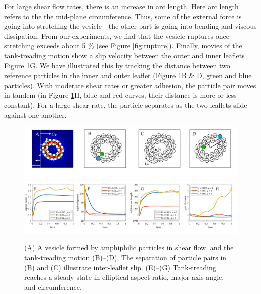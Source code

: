 For large shear flow rates, there is an increase in arc length. Here arc
length refers to the the mid-plane circumference. Thus, some of the
external force is going into stretching the vesicle---the other part is
going into bending and viscous dissipation. From our experiments, we
find that the vesicle ruptures once stretching exceeds about 5 \% (see
Figure \ref{fig:rupture}). Finally, movies of the tank-treading motion
show a slip velocity between the outer and inner leaflets Figure
\ref{fig:tanktreading}G. We have illustrated this by tracking the
distance between two reference particles in the inner and outer leaflet
(Figure \ref{fig:tanktreading}B \& D, green and blue particles). With
moderate shear rates or greater adhesion, the particle pair moves in
tandem (in Figure \ref{fig:tanktreading}H, blue and red curves, their
distance is more or less constant). For a large shear rate, the
particle separates as the two leaflets slide against one another. 

\begin{figure}
\begin{center}
\includegraphics[width=1\textwidth]{figures/PW_fig1A-D.pdf}
\includegraphics[width=1\textwidth]{figures/PW_fig1E-H.pdf}
\end{center}
\vspace{-0.3in}
\caption{\label{fig:tanktreading}\footnotesize (A) A vesicle formed by
  amphiphilic particles in shear flow, and the tank-treading motion
  (B)--(D). The separation of particle pairs in (B) and (C) illustrate
  inter-leaflet slip.  (E)--(G) Tank-treading reaches a steady state in
  elliptical aspect ratio, major-axis angle, and circumference.}
\end{figure}


%




